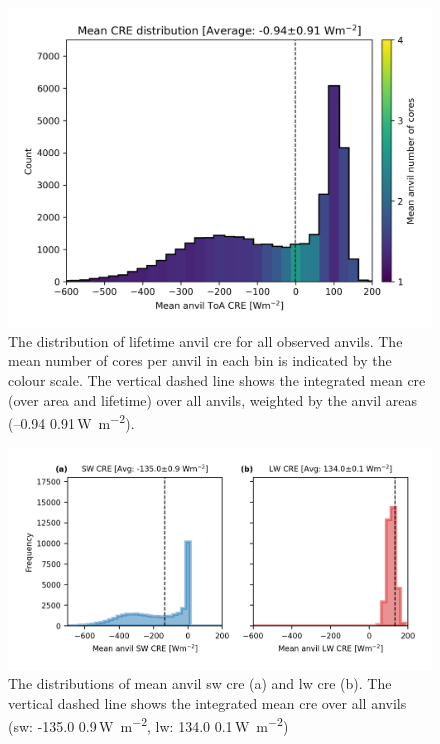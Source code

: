 \begin{figure}[tp]
    \includegraphics[width=\textwidth]{figures/chapter4_14.png}
    \caption[
    The distribution of lifetime anvil \acrshort{cre} for all observed anvils
    ]{
    The distribution of lifetime anvil \acrshort{cre} for all observed anvils. The mean number of cores per anvil in each bin is indicated by the colour scale. The vertical dashed line shows the integrated mean \acrshort{cre} (over area and lifetime) over all anvils, weighted by the anvil areas (--0.94\,\textpm\,0.91\,\unit{W m^{-2}}).
    }
    \label{fig:anvil_cre_dist}
\end{figure}
\begin{figure}[btp]
    \includegraphics[width=\textwidth]{figures/chapter4_15.png}
    \caption[
    The distributions of mean anvil \acrshort{sw} \acrshort{cre} and \acrshort{lw} \acrshort{cre}
    ]{
    The distributions of mean anvil \acrshort{sw} \acrshort{cre} (a) and \acrshort{lw} \acrshort{cre} (b). The vertical dashed line shows the integrated mean \acrshort{cre} over all anvils (\acrshort{sw}: -135.0\,\textpm\,0.9\,\unit{W m^{-2}}, \acrshort{lw}: 134.0\,\textpm\,0.1\,\unit{W m^{-2}})
    }
    \label{fig:anvil_sw_lw_cre}
\end{figure}


